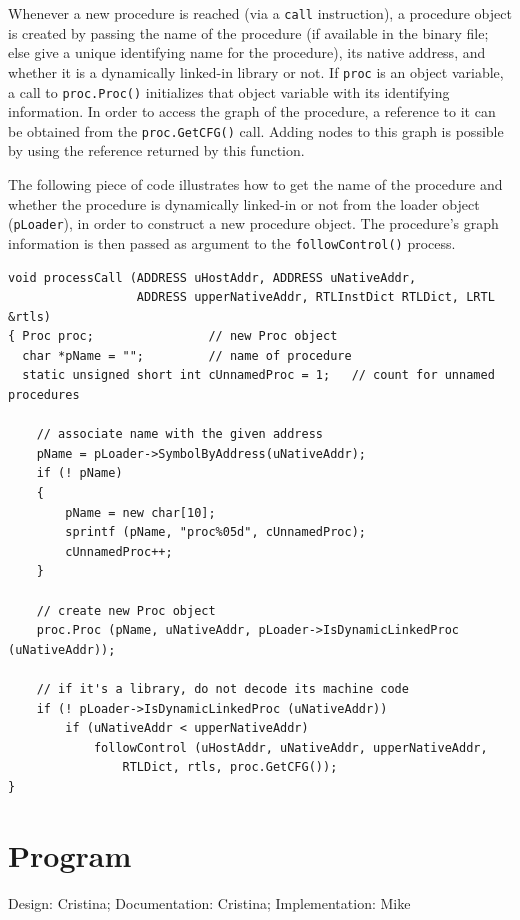 Whenever a new procedure is reached (via a \texttt{call} instruction), 
a procedure object is created by passing the name of the procedure
(if available in the binary file; else give a unique identifying 
name for the procedure), its native address, and whether it is a 
dynamically linked-in library or not.  If \texttt{proc} is an 
object variable, a call to \texttt{proc.Proc()} initializes that
object variable with its identifying information.  In order to 
access the graph of the procedure, a reference to it can be 
obtained from the \texttt{proc.GetCFG()} call.  Adding nodes 
to this graph is possible by using the reference returned by
this function.

The following piece of code illustrates how to get the name of
the procedure and whether the procedure is dynamically linked-in or not
from the loader object (\texttt{pLoader}), in order to construct
a new procedure object.  The procedure's graph information is then
passed as argument to the \texttt{followControl()} process.

{\small
\begin{verbatim}
void processCall (ADDRESS uHostAddr, ADDRESS uNativeAddr,
                  ADDRESS upperNativeAddr, RTLInstDict RTLDict, LRTL &rtls)
{ Proc proc;                // new Proc object
  char *pName = "";         // name of procedure
  static unsigned short int cUnnamedProc = 1;   // count for unnamed procedures
 
    // associate name with the given address
    pName = pLoader->SymbolByAddress(uNativeAddr);
    if (! pName)
    {
        pName = new char[10];
        sprintf (pName, "proc%05d", cUnnamedProc);
        cUnnamedProc++;
    }
    
    // create new Proc object
    proc.Proc (pName, uNativeAddr, pLoader->IsDynamicLinkedProc (uNativeAddr));

    // if it's a library, do not decode its machine code
    if (! pLoader->IsDynamicLinkedProc (uNativeAddr))
        if (uNativeAddr < upperNativeAddr)
            followControl (uHostAddr, uNativeAddr, upperNativeAddr,
                RTLDict, rtls, proc.GetCFG());
}
\end{verbatim}
}


\section{Program}
\label{sec-ir-prog}
{\small  
\begin{flushright}
Design: Cristina; Documentation: Cristina; Implementation: Mike
\end{flushright}
}

